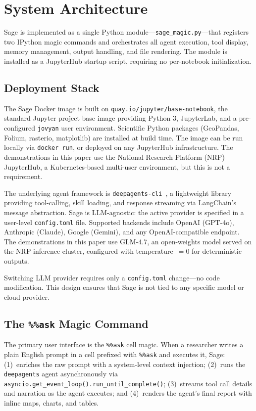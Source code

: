 \documentclass[10pt,twocolumn]{article}
\begin{document}
\section{System Architecture}

Sage is implemented as a single Python module---\texttt{sage\_magic.py}---that registers two IPython magic commands and orchestrates all agent execution, tool display, memory management, output handling, and file rendering. The module is installed as a JupyterHub startup script, requiring no per-notebook initialization.

\subsection{Deployment Stack}

The Sage Docker image is built on \texttt{quay.io/jupyter/base-notebook}, the standard Jupyter project base image providing Python 3, JupyterLab, and a pre-configured \texttt{jovyan} user environment. Scientific Python packages (GeoPandas, Folium, rasterio, matplotlib) are installed at build time. The image can be run locally via \texttt{docker run}, or deployed on any JupyterHub infrastructure. The demonstrations in this paper use the National Research Platform (NRP) JupyterHub, a Kubernetes-based multi-user environment, but this is not a requirement.

The underlying agent framework is \texttt{deepagents-cli}~\cite{deepagents}, a lightweight library providing tool-calling, skill loading, and response streaming via LangChain's message abstraction. Sage is LLM-agnostic: the active provider is specified in a user-level \texttt{config.toml} file. Supported backends include OpenAI (GPT-4o), Anthropic (Claude), Google (Gemini), and any OpenAI-compatible endpoint. The demonstrations in this paper use GLM-4.7, an open-weights model served on the NRP inference cluster, configured with temperature~$= 0$ for deterministic outputs.

Switching LLM provider requires only a \texttt{config.toml} change---no code modification. This design ensures that Sage is not tied to any specific model or cloud provider.

\subsection{The \texttt{\%\%ask} Magic Command}

The primary user interface is the \texttt{\%\%ask} cell magic. When a researcher writes a plain English prompt in a cell prefixed with \texttt{\%\%ask} and executes it, Sage: (1)~enriches the raw prompt with a system-level context injection; (2)~runs the \texttt{deepagents} agent asynchronously via \texttt{asyncio.get\_event\_loop().run\_until\_complete()}; (3)~streams tool call details and narration as the agent executes; and (4)~renders the agent's final report with inline maps, charts, and tables.
\end{document}
